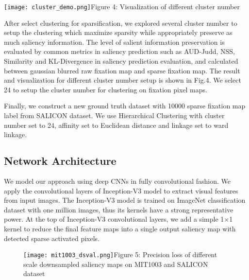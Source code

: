 \documentclass[letterpaper, 10 pt, conference]{ieeeconf}  %
\begin{document}
\begin{figure*}[!t]
\centering
    \texttt{[image: cluster\_demo.png]}{Figure 4: Visualization of different cluster number\label{fig4}}
\end{figure*}

\par After select clustering for sparsification, we explored several cluster number to setup the clustering which maximize sparsity while appropriately preserve as much saliency information. The level of salient information preservation is evaluated by common metrics in saliency prediction such as AUD-Judd, NSS, Similarity and KL-Divergence in saliency prediction evaluation, and calculated between gaussian blurred raw fixation map and sparse fixation map. The result and visualization for different cluster number setup is shown in Fig.4. We select 24 to setup the cluster number for clustering on fixation pixel maps.

\par Finally, we construct a new ground truth dataset with 10000 sparse fixation map label from SALICON dataset. We use Hierarchical Clustering with cluster number set to 24, affinity set to Euclidean distance and linkage set to ward linkage.

\subsection{Network Architecture}

\par We model our approach using deep CNNs in fully convolutional fashion. We apply the convolutional layers of Inception-V3 \cite{b22} model to extract visual features from input images. The Inception-V3 model is trained on ImageNet \cite{b28} classification dataset with one million images, thus its kernels have a strong representative power. At the top of Inception-V3 convolutional layers, we add a simple 1$\times$1 kernel to reduce the final feature maps into a single output saliency map with detected sparse activated pixels.

\begin{figure}
\centering
    \texttt{[image: mit1003\_dsval.png]}{Figure 5: Precision loss of different scale downsampled saliency maps on MIT1003 and SALICON dataset\label{fig5}}
\end{figure}
\end{document}
